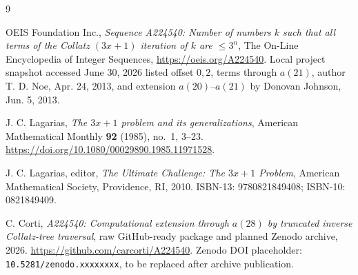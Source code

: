 \documentclass[11pt]{article}
\theoremstyle{definition}
\theoremstyle{remark}
\begin{document}
\begin{thebibliography}{9}
\sloppy
\raggedright

OEIS Foundation Inc.,
\emph{Sequence A224540: Number of numbers \(k\) such that all terms of the
Collatz \((3x+1)\) iteration of \(k\) are \(\leq 3^n\)},
The On-Line Encyclopedia of Integer Sequences,
\url{https://oeis.org/A224540}.
Local project snapshot accessed June 30, 2026 listed offset \(0,2\), terms
through \(a(21)\), author T. D. Noe, Apr. 24, 2013, and extension
\(a(20)\)--\(a(21)\) by Donovan Johnson, Jun. 5, 2013.

J. C. Lagarias,
\emph{The \(3x+1\) problem and its generalizations},
American Mathematical Monthly \textbf{92} (1985), no.~1, 3--23.
\url{https://doi.org/10.1080/00029890.1985.11971528}.

J. C. Lagarias, editor,
\emph{The Ultimate Challenge: The \(3x+1\) Problem},
American Mathematical Society, Providence, RI, 2010.
ISBN-13: 9780821849408; ISBN-10: 0821849409.

C. Corti,
\emph{A224540: Computational extension through \(a(28)\) by truncated inverse
Collatz-tree traversal},
raw GitHub-ready package and planned Zenodo archive, 2026.
\url{https://github.com/carcorti/A224540}.
Zenodo DOI placeholder: \texttt{10.5281/zenodo.xxxxxxxx}, to be replaced
after archive publication.

\end{thebibliography}
\end{document}
